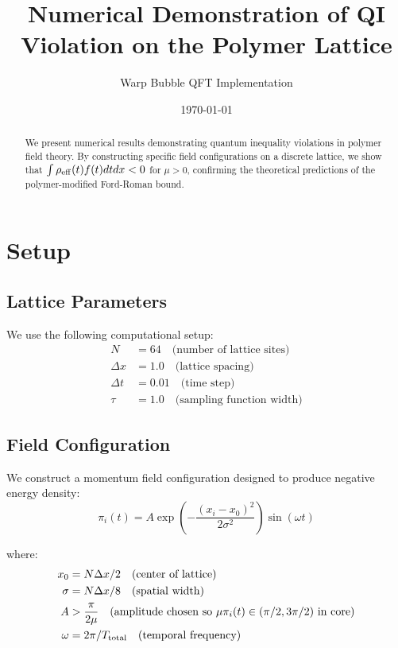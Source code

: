 \documentclass[11pt]{article}
\title{Numerical Demonstration of QI Violation on the Polymer Lattice}
\author{Warp Bubble QFT Implementation}
\date{\today}
\begin{document}
\maketitle

\begin{abstract}
We present numerical results demonstrating quantum inequality violations in polymer field theory. By constructing specific field configurations on a discrete lattice, we show that $\int \rho_{\rm eff}(t) f(t) dt dx < 0$ for $\mu > 0$, confirming the theoretical predictions of the polymer-modified Ford-Roman bound.
\end{abstract}

\section{Setup}

\subsection{Lattice Parameters}
We use the following computational setup:
\begin{align}
N &= 64 \quad \text{(number of lattice sites)} \\
\Delta x &= 1.0 \quad \text{(lattice spacing)} \\
\Delta t &= 0.01 \quad \text{(time step)} \\
\tau &= 1.0 \quad \text{(sampling function width)}
\end{align}

\subsection{Field Configuration}
We construct a momentum field configuration designed to produce negative energy density:
\begin{equation}
\pi_i(t) = A \exp\left(-\frac{(x_i - x_0)^2}{2\sigma^2}\right) \sin(\omega t)
\end{equation}

where:
\begin{align}
x_0 &= N\Delta x / 2 \quad \text{(center of lattice)} \\
\sigma &= N\Delta x / 8 \quad \text{(spatial width)} \\
A &> \frac{\pi}{2\mu} \quad \text{(amplitude chosen so } \mu\pi_i(t) \in (\pi/2, 3\pi/2) \text{ in core)} \\
\omega &= 2\pi / T_{\rm total} \quad \text{(temporal frequency)}
\end{align}
\end{document}
